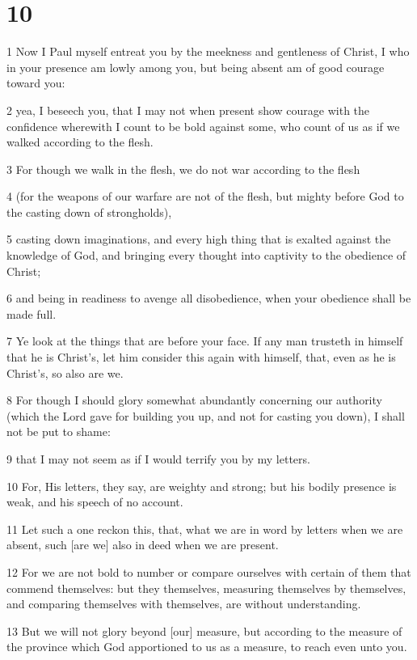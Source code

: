 \chapter{10}

\par 1 Now I Paul myself entreat you by the meekness and gentleness of Christ, I who in your presence am lowly among you, but being absent am of good courage toward you:
\par 2 yea, I beseech you, that I may not when present show courage with the confidence wherewith I count to be bold against some, who count of us as if we walked according to the flesh.
\par 3 For though we walk in the flesh, we do not war according to the flesh
\par 4 (for the weapons of our warfare are not of the flesh, but mighty before God to the casting down of strongholds),
\par 5 casting down imaginations, and every high thing that is exalted against the knowledge of God, and bringing every thought into captivity to the obedience of Christ;
\par 6 and being in readiness to avenge all disobedience, when your obedience shall be made full.
\par 7 Ye look at the things that are before your face. If any man trusteth in himself that he is Christ's, let him consider this again with himself, that, even as he is Christ's, so also are we.
\par 8 For though I should glory somewhat abundantly concerning our authority (which the Lord gave for building you up, and not for casting you down), I shall not be put to shame:
\par 9 that I may not seem as if I would terrify you by my letters.
\par 10 For, His letters, they say, are weighty and strong; but his bodily presence is weak, and his speech of no account.
\par 11 Let such a one reckon this, that, what we are in word by letters when we are absent, such [are we] also in deed when we are present.
\par 12 For we are not bold to number or compare ourselves with certain of them that commend themselves: but they themselves, measuring themselves by themselves, and comparing themselves with themselves, are without understanding.
\par 13 But we will not glory beyond [our] measure, but according to the measure of the province which God apportioned to us as a measure, to reach even unto you.
